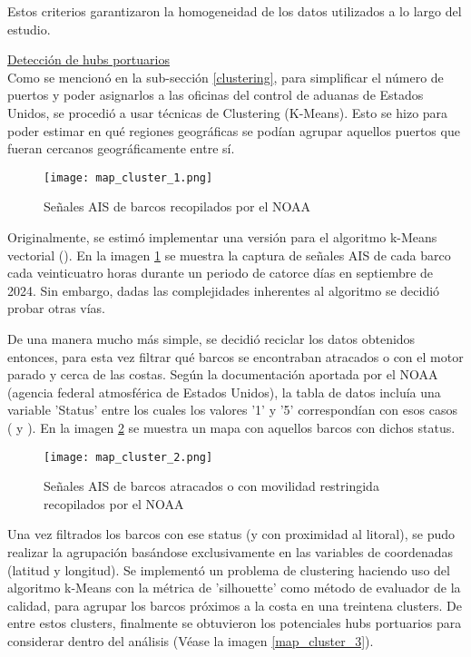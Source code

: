 \documentclass[12pt]{article}
\begin{document}
		Estos criterios garantizaron la homogeneidad de los datos utilizados a lo largo del estudio.
		
		\underline{Detección de hubs portuarios}\\ %
		Como se mencionó en la sub-sección \ref{clustering}, para simplificar el número de puertos y poder asignarlos a las oficinas del control de aduanas de Estados Unidos, se procedió a usar técnicas de Clustering (K-Means). Esto se hizo para poder estimar en qué regiones geográficas se podían agrupar aquellos puertos que fueran cercanos geográficamente entre sí. 
		
		\begin{figure}[H]
			\caption{\label{map_cluster_1} Señales AIS de barcos recopilados por el NOAA}
			\centering
			\texttt{[image: map\_cluster\_1.png]}
		\end{figure}
		
		Originalmente, se estimó implementar una versión para el algoritmo k-Means vectorial (\cite{ferreira2012vectorfieldkmeansclustering}). En la imagen \ref{map_cluster_1} se muestra la captura de señales AIS de cada barco cada veinticuatro horas durante un periodo de catorce días en septiembre de 2024. Sin embargo, dadas las complejidades inherentes al algoritmo se decidió probar otras vías.
		
		De una manera mucho más simple, se decidió reciclar los datos obtenidos entonces, para esta vez filtrar qué barcos se encontraban atracados o con el motor parado y cerca de las costas. Según la documentación aportada por el NOAA (agencia federal atmosférica de Estados Unidos), la tabla de datos incluía una variable 'Status' entre los cuales los valores '1' y '5' correspondían con esos casos (\cite{NOAA_AIS_DataDictionary} y \cite{MarineTraffic_AIS_Status}). En la imagen \ref{map_cluster_2} se muestra un mapa con aquellos barcos con dichos status.
		
		\begin{figure}[H]
			\caption{\label{map_cluster_2} Señales AIS de barcos atracados o con movilidad restringida recopilados por el NOAA}
			\centering
			\hspace*{1cm}
			\texttt{[image: map\_cluster\_2.png]}
		\end{figure}
	
		Una vez filtrados los barcos con ese status (y con proximidad al litoral), se pudo realizar la agrupación basándose exclusivamente en las variables de coordenadas (latitud y longitud). Se implementó un problema de clustering haciendo uso del algoritmo k-Means con la métrica de 'silhouette' como método de evaluador de la calidad, para agrupar los barcos próximos a la costa en una treintena clusters. De entre estos clusters, finalmente se obtuvieron los potenciales hubs portuarios para considerar dentro del análisis (Véase la imagen \ref{map_cluster_3}).
		
\end{document}
